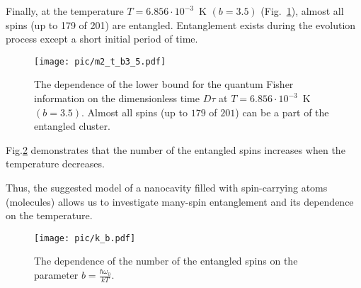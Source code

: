 \par
Finally, at the temperature ${T= 6.856\cdot10^{-3}}$~K $(b=3.5)$ (Fig.~\ref{fig:m2_t_b3.5}), almost all spins (up to 179 of 201) are entangled. Entanglement exists during  the evolution process except a short initial period of time. 
\begin{figure}
    \centering
    \texttt{[image: pic/m2\_t\_b3\_5.pdf]}
    \caption{The dependence of the lower bound for the quantum Fisher information on the dimensionless time $D\tau$ at ${T=6.856\cdot10^{-3}}$~K $(b=3.5)$.
    Almost all spins (up to $179$ of $201$) can be a part of the entangled cluster.}
    \label{fig:m2_t_b3.5}
\end{figure}
\par 
Fig.\ref{fig:k_b} demonstrates that the number of the entangled spins increases when the temperature decreases.
\par
Thus, the suggested model of a nanocavity filled with spin-carrying atoms (molecules) allows us to investigate many-spin entanglement and its dependence on the temperature.
\begin{figure}
    \centering
    \texttt{[image: pic/k\_b.pdf]}
    \caption{The dependence of the number of the entangled spins on the parameter $b = \frac{\hbar\omega_0}{kT} $.}
    \label{fig:k_b}
\end{figure}
